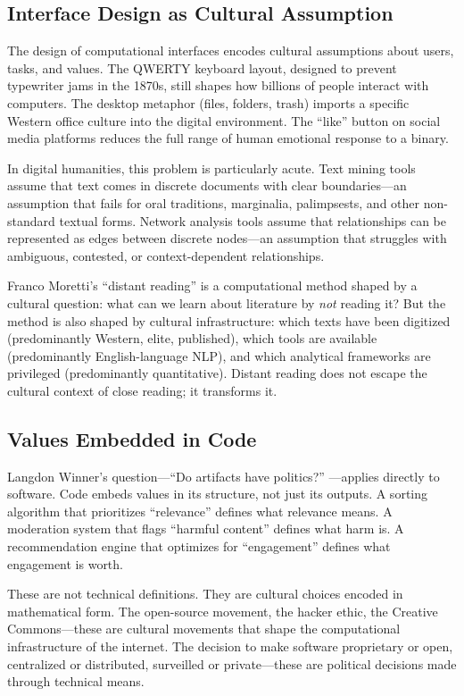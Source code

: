 \documentclass[11pt,a4paper]{article}
\begin{document}
\subsection{Interface Design as Cultural Assumption}

The design of computational interfaces encodes cultural assumptions about users, tasks, and values. The QWERTY keyboard layout, designed to prevent typewriter jams in the 1870s, still shapes how billions of people interact with computers. The desktop metaphor (files, folders, trash) imports a specific Western office culture into the digital environment. The ``like'' button on social media platforms reduces the full range of human emotional response to a binary.

In digital humanities, this problem is particularly acute. Text mining tools assume that text comes in discrete documents with clear boundaries---an assumption that fails for oral traditions, marginalia, palimpsests, and other non-standard textual forms. Network analysis tools assume that relationships can be represented as edges between discrete nodes---an assumption that struggles with ambiguous, contested, or context-dependent relationships.

Franco Moretti's ``distant reading'' \citep{moretti2013} is a computational method shaped by a cultural question: what can we learn about literature by \emph{not} reading it? But the method is also shaped by cultural infrastructure: which texts have been digitized (predominantly Western, elite, published), which tools are available (predominantly English-language NLP), and which analytical frameworks are privileged (predominantly quantitative). Distant reading does not escape the cultural context of close reading; it transforms it.

\subsection{Values Embedded in Code}

Langdon Winner's question---``Do artifacts have politics?'' \citep{winner1980}---applies directly to software. Code embeds values in its structure, not just its outputs. A sorting algorithm that prioritizes ``relevance'' defines what relevance means. A moderation system that flags ``harmful content'' defines what harm is. A recommendation engine that optimizes for ``engagement'' defines what engagement is worth.

These are not technical definitions. They are cultural choices encoded in mathematical form. The open-source movement, the hacker ethic, the Creative Commons---these are cultural movements that shape the computational infrastructure of the internet. The decision to make software proprietary or open, centralized or distributed, surveilled or private---these are political decisions made through technical means.
\end{document}
